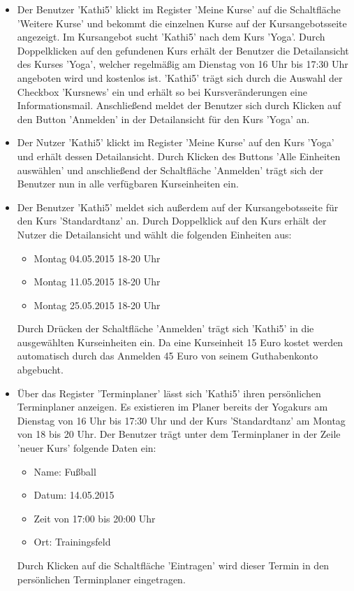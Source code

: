 \documentclass[a4paper]{scrreprt}
\begin{document}
			\begin{itemize}
				\item {} 
				Der Benutzer 'Kathi5' klickt im Register 'Meine Kurse' auf die Schaltfläche 'Weitere Kurse' und bekommt die einzelnen Kurse auf der Kursangebotsseite angezeigt. Im Kursangebot sucht 'Kathi5' nach dem Kurs 'Yoga'. Durch Doppelklicken auf den gefundenen Kurs erhält der Benutzer die Detailansicht des Kurses 'Yoga', welcher regelmäßig am Dienstag von 16 Uhr bis 17:30 Uhr angeboten wird und kostenlos ist. 'Kathi5' trägt sich durch die Auswahl der Checkbox 'Kursnews' ein und erhält so bei Kursveränderungen eine Informationsmail. Anschließend meldet der Benutzer sich durch Klicken auf den Button 'Anmelden' in der Detailansicht für den Kurs 'Yoga' an.	
				
				\item {} 
				Der Nutzer 'Kathi5'	klickt im Register 'Meine Kurse' auf den Kurs 'Yoga' und erhält dessen Detailansicht. Durch Klicken des Buttons 'Alle Einheiten auswählen' und anschließend der Schaltfläche 'Anmelden' trägt sich der Benutzer nun in alle verfügbaren Kurseinheiten ein.
				
				\item {}
				Der Benutzer 'Kathi5' meldet sich außerdem auf der Kursangebotsseite für den Kurs 'Standardtanz' an. Durch Doppelklick auf den Kurs erhält der Nutzer die Detailansicht und wählt die folgenden Einheiten aus:
					\begin{itemize}
						\item Montag 04.05.2015 18-20 Uhr
						\item Montag 11.05.2015 18-20 Uhr
						\item Montag 25.05.2015 18-20 Uhr		
					\end{itemize}	
				Durch Drücken der Schaltfläche 'Anmelden' trägt sich 'Kathi5' in die ausgewählten Kurseinheiten ein. Da eine Kurseinheit 15 Euro kostet werden automatisch durch das Anmelden 45 Euro von seinem Guthabenkonto abgebucht.
				
				\item {}
				Über das Register 'Terminplaner' lässt sich 'Kathi5' ihren persönlichen Terminplaner anzeigen. Es existieren im Planer bereits der Yogakurs am Dienstag von 16 Uhr bis 17:30 Uhr und der Kurs 'Standardtanz' am Montag von 18 bis 20 Uhr. Der Benutzer trägt unter dem Terminplaner in der Zeile 'neuer Kurs' folgende Daten ein:
					\begin{itemize}
						\item Name: Fußball
						\item Datum: 14.05.2015
						\item Zeit von 17:00 bis 20:00 Uhr
						\item Ort: Trainingsfeld		
					\end{itemize}
				Durch Klicken auf die Schaltfläche 'Eintragen' wird dieser Termin in den persönlichen Terminplaner eingetragen.
				

\end{itemize}
\end{document}
